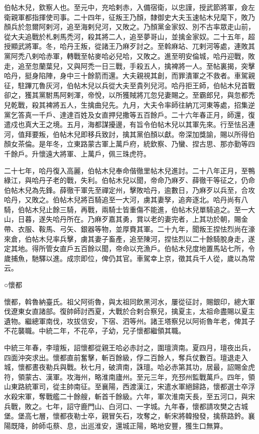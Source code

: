 \begin{pinyinscope}
 伯帖木兒，欽察人也。至元中，充哈剌赤，入備宿衛，以忠謹，授武節將軍，僉左衛親軍都指揮使司事。二十四年，征叛王乃顏，隸御史大夫玉速帖木兒麾下，敗乃顏兵於忽爾阿剌河，追至海剌兒河，又敗之。乃顏黨金家奴、別不古率眾走山前，從大夫追戰於札剌馬禿河，殺其將二人，追至夢哥山，並擒金家奴。二十五年，超授顯武將軍。冬，哈丹王叛，從諸王乃麻歹討之。至斡麻站、兀剌河等處，連敗其黨阿禿八剌哈赤軍，轉戰至帖麥哈必兒哈，又敗之。進至明安倫城，哈丹迎戰，敗走，追至忽蘭葉兒，又與阿禿一日三戰，手殺五人，擒裨將一人。至帖裏揭，突擊哈丹，挺身陷陣，身中三十餘箭而還。大夫親視其創，而罪潰軍之不救者。車駕親征，駐蹕兀魯灰河，伯帖木兒以兵從大夫至貴列兒河。哈丹拒王師，伯帖木兒首戰卻之，獲其黨駙馬阿剌渾，帝悅，以所獲賊將兀忽兒妻賜之。至霸郎兒，與忽都禿兒乾戰，殺其裨將五人，生擒曲兒先。九月，大夫令率師往納兀河東等處，招集逆黨乞答真一千戶、達達百姓及女直押兒撒等五百餘戶。二十六年春正月，師還，復遣戍也真大王之境。五月，海都謀擾邊，有旨令伯帖木兒以其軍先來。行至怯呂連河，值拜要叛，伯帖木兒即移兵致討，擒其黨伯顏以獻。帝深加獎諭，賜以所得伯顏女茶倫。是年冬，立東路蒙古軍上萬戶府，統欽察、乃蠻、捏古思、那亦勤等四千餘戶。升懷遠大將軍、上萬戶，佩三珠虎符。



 二十七年，哈丹復入高麗，伯帖木兒奉命偕徹里帖木兒進討。二十八年正月，至鴨綠江，與哈丹子老的戰，失利。伯帖木兒以聞，帝命乃麻歹、薛徹干等征之，仍命伯帖木兒為先鋒。薛徹干軍先至禪定州，擊敗哈丹，逾數日，乃麻歹以兵至，合攻哈丹，又敗之。伯帖木兒將百騎追至一大河，虜其妻孥，追奔逐北。哈丹尚有八騎，伯帖木兒止餘三騎，再戰，兩騎士皆重傷不能進，伯帖木兒單騎追之。至一大山，日暮，遂失哈丹所在。乃麻歹嘉其勇，賞以老的妻完者，上其功於朝，賜金帶、衣服、鞍馬、弓矢、銀器等物，並厚賚其軍。二十九年，聞叛王捏怯烈尚在濠來倉，伯帖木兒率兵擊，虜其妻子畜產，追至陳河，捏怯烈以二十餘騎脫身走，遂定其地。得所管女直戶五百餘以聞，帝命以充漁戶。伯帖木兒度地置馬站七所，令歲捕魚，馳驛以進。成宗即位，俾仍其官。車駕幸上京，徵其兵千人從，歲以為常云。



 ○懷都



 懷都，斡魯納臺氏。祖父阿術魯，與太祖同飲黑河水，屢從征討，賜銀印，總大軍伐遼東女直諸部。復帥師討西夏，大戰於合剌合察兒，擒夏主，太祖命盡賜以夏主遺物。繼總軍南伐，攻拔信安，下宿、泗等州。諸王塔察兒以阿術魯年老，俾其子不花襲職。中統二年，不花卒，子幼，兄子懷都繼領其職。



 中統三年春，李璮叛，詔懷都從親王哈必赤討之，圍璮濟南。夏四月，璮夜出兵，四面沖突求出。懷都直前奮擊，斬百餘級，俘二百餘人，奪兵仗數百。璮退走入城，懷都晝夜勒兵與戰。秋七月，破濟南，誅璮。哈必赤第其功，居最，詔賜金虎符，領蒙古、漢軍。攻海州，略淮南廬州。至元三年，充邳州監戰萬戶。四年，領山東路統軍司，從主帥南征。至襄陽，西渡漢江，宋遣水軍絕歸路，懷都選士卒浮水殺宋軍，奪戰艦二十餘艘，斬首千餘級。六年，軍次淮南天長，至五河口，與宋兵戰，敗之。七年，詔守鹿門山、白河口、一字城。九年春，懷都請攻樊之古城堡。堡高七層，懷都夜勒士卒，親冒矢石，攻奪之，斬宋將韓撥發，擒蔡路鈐。襄陽既降，帥師屯蔡、息，出巡淮安，還城正陽，略地安豐，獲生口無算。




\end{pinyinscope}
